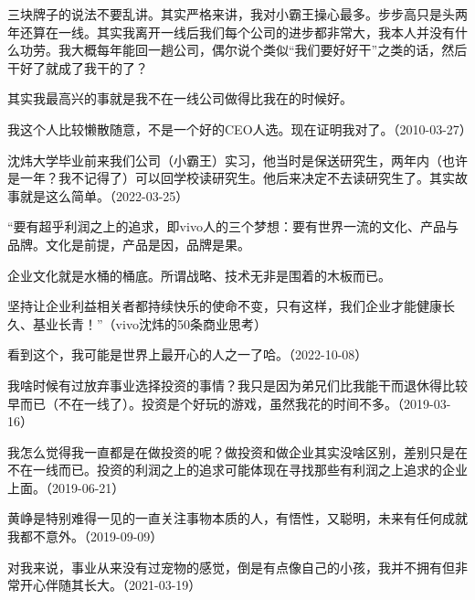 三块牌子的说法不要乱讲。其实严格来讲，我对小霸王操心最多。步步高只是头两年还算在一线。其实我离开一线后我们每个公司的进步都非常大，我本人并没有什么功劳。我大概每年能回一趟公司，偶尔说个类似“我们要好好干”之类的话，然后干好了就成了我干的了？

其实我最高兴的事就是我不在一线公司做得比我在的时候好。

我这个人比较懒散随意，不是一个好的CEO人选。现在证明我对了。（2010-03-27）


沈炜大学毕业前来我们公司（小霸王）实习，他当时是保送研究生，两年内（也许是一年？我不记得了）可以回学校读研究生。他后来决定不去读研究生了。其实故事就是这么简单。（2022-03-25）

“要有超乎利润之上的追求，即vivo人的三个梦想：要有世界一流的文化、产品与品牌。文化是前提，产品是因，品牌是果。

企业文化就是水桶的桶底。所谓战略、技术无非是围着的木板而已。

坚持让企业利益相关者都持续快乐的使命不变，只有这样，我们企业才能健康长久、基业长青！”（vivo沈炜的50条商业思考）

看到这个，我可能是世界上最开心的人之一了哈。（2022-10-08）


我啥时候有过放弃事业选择投资的事情？我只是因为弟兄们比我能干而退休得比较早而已（不在一线了）。投资是个好玩的游戏，虽然我花的时间不多。（2019-03-16）


我怎么觉得我一直都是在做投资的呢？做投资和做企业其实没啥区别，差别只是在不在一线而已。投资的利润之上的追求可能体现在寻找那些有利润之上追求的企业上面。（2019-06-21）


黄峥是特别难得一见的一直关注事物本质的人，有悟性，又聪明，未来有任何成就我都不意外。（2019-09-09）

对我来说，事业从来没有过宠物的感觉，倒是有点像自己的小孩，我并不拥有但非常开心伴随其长大。（2021-03-19）

